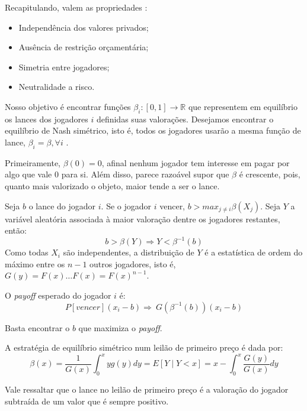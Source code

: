 Recapitulando, valem as propriedades \citet{krishna}:
\begin{itemize}
	\item Independência dos valores privados;
	\item Ausência de restrição orçamentária;
	\item Simetria entre jogadores;
	\item Neutralidade a risco.
\end{itemize}

Nosso objetivo é encontrar funções $\beta_i : [0, 1] \xrightarrow{} \mathbb{R}$ que representem em equilíbrio os lances dos jogadores $i$ definidas suas valorações. Desejamos encontrar o equilíbrio de Nash simétrico, isto é, todos os jogadores usarão a mesma função de lance, $\beta_i = \beta, \forall i$ \citet{krishna}.

Primeiramente, $\beta(0) = 0$, afinal nenhum jogador tem interesse em pagar por algo que vale 0 para si. Além disso, parece razoável supor que $\beta$ é crescente, pois, quanto mais valorizado o objeto, maior tende a ser o lance.

Seja $b$ o lance do jogador $i$. Se o jogador $i$ vencer, $b > max_{j \ne i} \beta(X_j)$. Seja $Y$ a variável aleatória associada à maior valoração dentre os jogadores restantes, então:
\begin{equation}
b > \beta(Y) \Rightarrow Y < \beta^{-1}(b)    
\end{equation}
Como todas $X_i$ são independentes, a distribuição de $Y$ é a estatística de ordem do máximo entre os $n-1$ outros jogadores, isto é, $G(y) = F(x) \ldots F(x) = F(x)^{n-1}$.

O \emph{payoff} esperado do jogador $i$ é:
\begin{equation}
    P[vencer] (x_i - b) \Rightarrow \
    G(\beta^{-1}(b)) (x_i - b)
\end{equation}

Basta encontrar o $b$ que maximiza o \emph{payoff}.

\begin{proposicao}
    \label{prop:nash-primeiro-preco}
    A estratégia de equilíbrio simétrico num leilão de primeiro preço é dada por:
    \begin{equation}
        \beta(x) = \frac{1}{G(x)} \int_{0}^{x} yg(y)dy = E\left[ Y \mid Y<x \right] = x - \int_{0}^{x} \frac{G(y)}{G(x)}dy
    \end{equation}
\end{proposicao}

Vale ressaltar que o lance no leilão de primeiro preço é a valoração do jogador subtraída de um valor que é sempre positivo.

